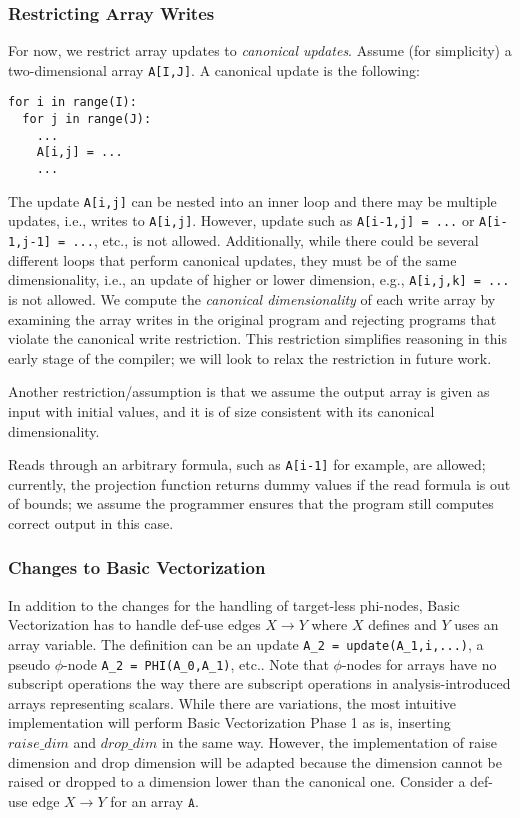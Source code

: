 \subsubsection{Restricting Array Writes}

For now, we restrict array updates to \emph{canonical updates}. Assume (for simplicity) a two-dimensional array \texttt{A[I,J]}. A canonical update is the following:
\begin{verbatim}
for i in range(I):
  for j in range(J):
    ...
    A[i,j] = ...
    ...
\end{verbatim}

The update \texttt{A[i,j]} can be nested into an inner loop and there may be multiple updates, i.e., writes to \texttt{A[i,j]}. However, update such as \texttt{A[i-1,j] = ...} or \texttt{A[i-1,j-1] = ...}, etc., is not allowed. Additionally, while there could be several different loops that perform canonical updates, they must be of the same dimensionality, i.e., an update of higher or lower dimension, e.g., \texttt{A[i,j,k] = ...} is not allowed. We compute the \emph{canonical dimensionality} of each write array by examining the array writes in the original program and rejecting programs that violate the canonical write restriction. This restriction simplifies reasoning in this early stage of the compiler; we will look to relax the restriction in future work.

Another restriction/assumption is that we assume the output array is given as input with initial values, and it is of size consistent with its canonical dimensionality.

Reads through an arbitrary formula, such as \texttt{A[i-1]} for example, are allowed; currently, the projection function returns dummy values if the read formula is out of bounds; we assume the programmer ensures that the program still computes correct output in this case.

\subsubsection{Changes to Basic Vectorization}

In addition to the changes for the handling of target-less phi-nodes, Basic Vectorization has to handle def-use edges $X \rightarrow Y$ where $X$ defines and $Y$ uses an array variable. The definition can be an update \texttt{A\_2 = update(A\_1,i,...)}, a pseudo $\phi$-node \texttt{A\_2 = PHI(A\_0,A\_1)}, etc.. Note that $\phi$-nodes for arrays have no subscript operations the way there are subscript operations in analysis-introduced arrays representing scalars. While there are variations, the most intuitive implementation will perform Basic Vectorization Phase 1 as is, inserting
$\mathit{raise\_dim}$ and $\mathit{drop\_dim}$ in the same way. However, the implementation of raise dimension and drop dimension will be adapted because the dimension cannot be raised or dropped to a dimension lower than the canonical one. Consider a def-use edge $X \rightarrow Y$ for an array $\texttt{A}$.

